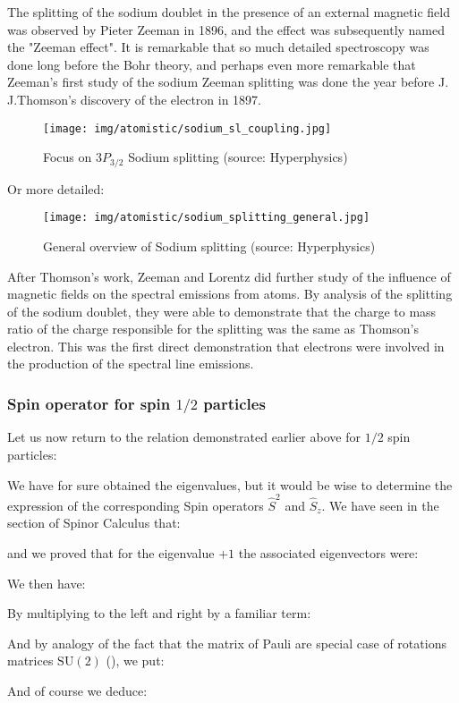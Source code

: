 	The splitting of the sodium doublet in the presence of an external magnetic field was observed by Pieter Zeeman in 1896, and the effect was subsequently named the "Zeeman effect". It is remarkable that so much detailed spectroscopy was done long before the Bohr theory, and perhaps even more remarkable that Zeeman's first study of the sodium Zeeman splitting was done the year before J. J.Thomson's discovery of the electron in 1897.
	\begin{figure}[H]
		\centering
		\texttt{[image: img/atomistic/sodium\_sl\_coupling.jpg]}
		\caption[]{Focus on $3P_{3/2}$ Sodium splitting (source: Hyperphysics)}
	\end{figure}
	Or more detailed:
	\begin{figure}[H]
		\centering
		\texttt{[image: img/atomistic/sodium\_splitting\_general.jpg]}
		\caption[]{General overview of Sodium splitting (source: Hyperphysics)}
	\end{figure}
	After Thomson's work, Zeeman and Lorentz did further study of the influence of magnetic fields on the spectral emissions from atoms. By analysis of the splitting of the sodium doublet, they were able to demonstrate that the charge to mass ratio of the charge responsible for the splitting was the same as Thomson's electron. This was the first direct demonstration that electrons were involved in the production of the spectral line emissions.
	
	\subsubsection{Spin operator for spin $1/2$ particles}
	Let us now return to the relation demonstrated earlier above for $1/2$ spin particles:
	
	We have for sure obtained the eigenvalues, but it would be wise to determine the expression of the corresponding Spin operators $\hat{S}^2$ and $\hat{S}_z$. We have seen in the section of Spinor Calculus that:
	
	and we proved that for the eigenvalue $+1$ the associated eigenvectors were:
	
	We then have:
	
	By multiplying to the left and right by a familiar term:
	
	And by analogy of the fact that the matrix of Pauli are special case of rotations matrices $\text{SU}(2)$ (), we put:
	
	And of course we deduce:
	
